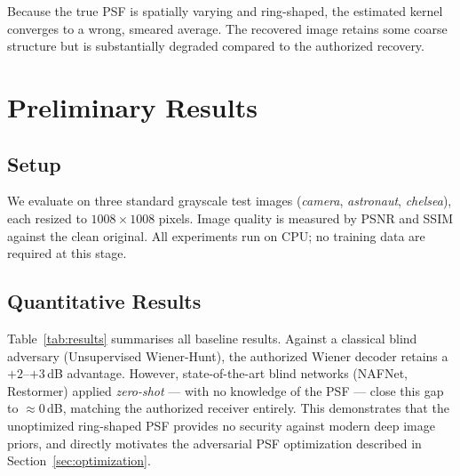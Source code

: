 \documentclass[11pt, a4paper]{article}
\begin{document}
Because the true PSF is spatially varying and ring-shaped, the estimated
kernel converges to a wrong, smeared average.  The recovered image retains
some coarse structure but is substantially degraded compared to the
authorized recovery.

\section{Preliminary Results}
\label{sec:results}

\subsection{Setup}

We evaluate on three standard grayscale test images (\emph{camera},
\emph{astronaut}, \emph{chelsea}), each resized to $1008\times 1008$ pixels.
Image quality is measured by PSNR and SSIM against the clean original.
All experiments run on CPU; no training data are required at this stage.

\subsection{Quantitative Results}

Table~\ref{tab:results} summarises all baseline results.
Against a classical blind adversary (Unsupervised Wiener-Hunt), the
authorized Wiener decoder retains a $+2$--$+3$\,dB advantage.
However, state-of-the-art blind networks (NAFNet, Restormer) applied
\emph{zero-shot} — with no knowledge of the PSF — close this gap to
$\approx 0$\,dB, matching the authorized receiver entirely.
This demonstrates that the unoptimized ring-shaped PSF provides no
security against modern deep image priors, and directly motivates the
adversarial PSF optimization described in Section~\ref{sec:optimization}.
\end{document}
